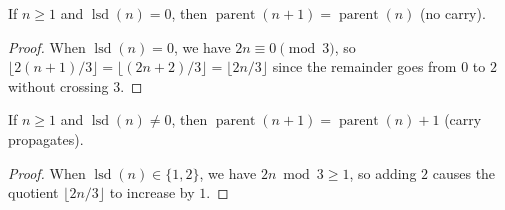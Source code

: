 \begin{lemma}\label{lemma:parent_succ_of_lsd_zero}\leanok
If $n \ge 1$ and $\operatorname{lsd}(n) = 0$, then
$\operatorname{parent}(n+1) = \operatorname{parent}(n)$ (no carry).
\end{lemma}
\begin{proof}\leanok
When $\operatorname{lsd}(n) = 0$, we have $2n \equiv 0 \pmod{3}$, so
$\lfloor 2(n+1)/3 \rfloor = \lfloor (2n+2)/3 \rfloor = \lfloor 2n/3 \rfloor$
since the remainder goes from $0$ to $2$ without crossing $3$.
\end{proof}

\begin{lemma}\label{lemma:parent_succ_of_lsd_pos}\leanok
If $n \ge 1$ and $\operatorname{lsd}(n) \ne 0$, then
$\operatorname{parent}(n+1) = \operatorname{parent}(n) + 1$ (carry propagates).
\end{lemma}
\begin{proof}\leanok
When $\operatorname{lsd}(n) \in \{1, 2\}$, we have $2n \bmod 3 \ge 1$, so adding $2$
causes the quotient $\lfloor 2n/3 \rfloor$ to increase by $1$.
\end{proof}

